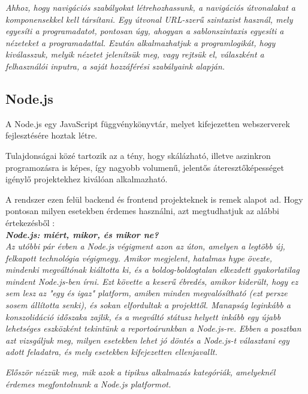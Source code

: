 \textit{Ahhoz, hogy navigációs szabályokat létrehozhassunk, a navigációs útvonalakat a komponensekkel kell társítani. Egy útvonal URL-szerű szintaxist használ, mely egyesíti a programadatot, pontosan úgy, ahogyan a sablonszintaxis egyesíti a nézeteket a programadattal. Ezután alkalmazhatjuk a programlogikát, hogy kiválasszuk, melyik nézetet jelenítsük meg, vagy rejtsük el, válaszként a felhasználói inputra, a saját hozzáférési szabályaink alapján.}


\subsection{Node.js}

A Node.js egy JavaScript függvénykönyvtár, melyet kifejezetten webszerverek fejlesztésére hoztak létre. 

Tulajdonságai közé tartozik az a tény, hogy skálázható, illetve aszinkron programozásra is képes, így nagyobb volumenű, jelentős áteresztőképességet igénylő projektekhez kiválóan alkalmazható.

A rendszer ezen felül backend és frontend projekteknek is remek alapot ad. Hogy pontosan milyen esetekben érdemes használni, azt megtudhatjuk az alábbi értekezésből \cite{nodejscikk}:\\

\noindent\textit{\textbf{\large{Node.js: miért, mikor, és mikor ne?}}}\\

\textit{Az utóbbi pár évben a Node.js végigment azon az úton, amelyen a legtöbb új, felkapott technológia végigmegy. Amikor megjelent, hatalmas hype övezte, mindenki megváltónak kiáltotta ki, és a boldog-boldogtalan elkezdett gyakorlatilag mindent Node.js-ben írni. Ezt követte a keserű ébredés, amikor kiderült, hogy ez sem lesz az "egy és igaz" platform, amiben minden megvalósítható (ezt persze sosem állította senki), és sokan elfordultak a projekttől. Manapság leginkább a konszolidáció időszaka zajlik, és a megváltó státusz helyett inkább egy újabb lehetséges eszközként tekintünk a reportoárunkban a Node.js-re. Ebben a posztban azt vizsgáljuk meg, milyen esetekben lehet jó döntés a Node.js-t választani egy adott feladatra, és mely esetekben kifejezetten ellenjavallt.}

\textit{Először nézzük meg, mik azok a tipikus alkalmazás kategóriák, amelyeknél érdemes megfontolnunk a Node.js platformot.}\\

